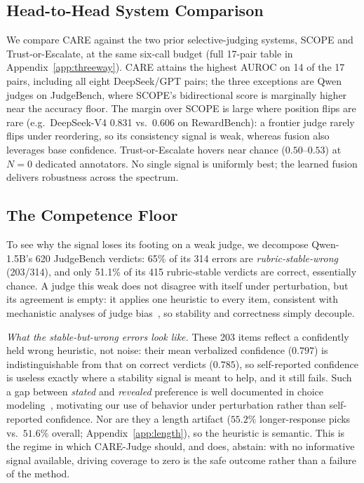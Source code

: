 \subsection{Head-to-Head System Comparison}
\label{sec:exp:comparison}

We compare CARE against the two prior selective-judging systems, SCOPE and Trust-or-Escalate, at the same six-call budget (full 17-pair table in Appendix~\ref{app:threeway}). CARE attains the highest AUROC on 14 of the 17 pairs, including all eight DeepSeek/GPT pairs; the three exceptions are Qwen judges on JudgeBench, where SCOPE's bidirectional score is marginally higher near the accuracy floor. The margin over SCOPE is large where position flips are rare (e.g.\ DeepSeek-V4 0.831 vs.\ 0.606 on RewardBench): a frontier judge rarely flips under reordering, so its consistency signal is weak, whereas fusion also leverages base confidence. Trust-or-Escalate hovers near chance ($0.50$--$0.53$) at $N{=}0$ dedicated annotators. No single signal is uniformly best; the learned fusion delivers robustness across the spectrum.

\subsection{The Competence Floor}
\label{sec:exp:stablewrong}

To see why the signal loses its footing on a weak judge, we decompose Qwen-1.5B's 620 JudgeBench verdicts: 65\% of its 314 errors are \emph{rubric-stable-wrong} (203/314), and only 51.1\% of its 415 rubric-stable verdicts are correct, essentially chance. A judge this weak does not disagree with itself under perturbation, but its agreement is empty: it applies one heuristic to every item, consistent with mechanistic analyses of judge bias~\citep{xu2026inside,panickssery2024evaluators}, so stability and correctness simply decouple.

\emph{What the stable-but-wrong errors look like.} These 203 items reflect a confidently held wrong heuristic, not noise: their mean verbalized confidence ($0.797$) is indistinguishable from that on correct verdicts ($0.785$), so self-reported confidence is useless exactly where a stability signal is meant to help, and it still fails. Such a gap between \emph{stated} and \emph{revealed} preference is well documented in choice modeling~\citep{yu2018quantum}, motivating our use of behavior under perturbation rather than self-reported confidence. Nor are they a length artifact ($55.2\%$ longer-response picks vs.\ $51.6\%$ overall; Appendix~\ref{app:length}), so the heuristic is semantic. This is the regime in which CARE-Judge should, and does, abstain: with no informative signal available, driving coverage to zero is the safe outcome rather than a failure of the method.

